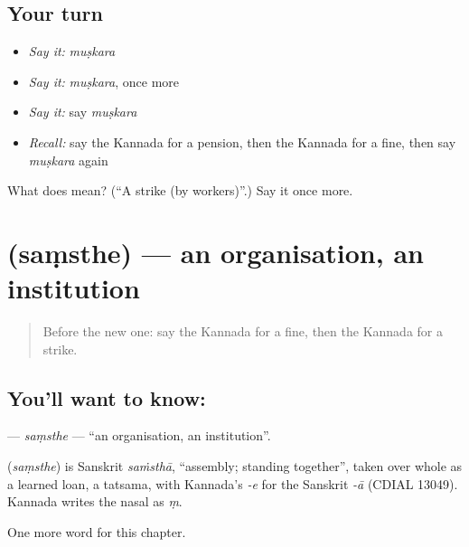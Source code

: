 \subsection*{Your turn}
\begin{itemize}
\raggedright
  \item \emph{Say it:} \emph{muṣkara}
  \item \emph{Say it:} \emph{muṣkara}, once more
  \item \emph{Say it:} say \emph{muṣkara}
  \item \emph{Recall:} say the Kannada for a pension, then the Kannada for a fine, then say \emph{muṣkara} again
\end{itemize}

\begin{tcolorbox}[breakable,colback=teal!4,colframe=teal!35!black,title={Before you move on}]
What does  mean? (\textquotedblleft{}A strike (by workers)\textquotedblright{}.) Say it once more.
\end{tcolorbox}
\section[\texorpdfstring{\kn{ಸಂಸ್ಥೆ} (saṃsthe)}{ಸಂಸ್ಥೆ (saṃsthe)}]{ (saṃsthe) — an organisation, an institution}

\label{lesson:KA-C271-samsthe}



\begin{quote}
Before the new one: say the Kannada for a fine, then the Kannada for a strike.
\end{quote}

\subsection*{You'll want to know: }
\textbf{} — \emph{saṃsthe} — \textquotedblleft{}an organisation, an institution\textquotedblright{}.

\begin{cousinweb}
\textbf{} (\emph{saṃsthe}) is Sanskrit \emph{saṁsthā}, \textquotedblleft{}assembly; standing together\textquotedblright{}, taken over whole as a learned loan, a tatsama, with Kannada's \emph{-e} for the Sanskrit \emph{-ā} (CDIAL 13049). Kannada writes the nasal as \emph{ṃ}.
\end{cousinweb}

\begin{grammarlens}[title={What you've built}]
One more word for this chapter.
\end{grammarlens}

